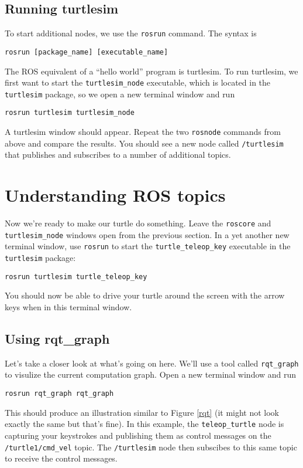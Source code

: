 \documentclass{article}
\begin{document}
\subsection{Running turtlesim}
To start additional nodes, we use the \verb=rosrun= command. The syntax is
\begin{Verbatim}[frame=single]
rosrun [package_name] [executable_name]
\end{Verbatim}

The ROS equivalent of a ``hello world'' program is turtlesim. To run turtlesim, we first want to start the \verb=turtlesim_node= executable, which is located in the \verb=turtlesim= package, so we open a new terminal window and run
\begin{Verbatim}[frame=single]
rosrun turtlesim turtlesim_node
\end{Verbatim}

A turtlesim window should appear. Repeat the two \verb=rosnode= commands from above and compare the results. You should see a new node called \verb=/turtlesim= that publishes and subscribes to a number of additional topics.

\section{Understanding ROS topics}
Now we're ready to make our turtle do something. Leave the \verb=roscore= and \verb=turtlesim_node= windows open from the previous section. In a yet another new terminal window, use \verb=rosrun= to start the \verb=turtle_teleop_key= executable in the \verb=turtlesim= package:

\begin{Verbatim}[frame=single]
rosrun turtlesim turtle_teleop_key
\end{Verbatim}

You should now be able to drive your turtle around the screen with the arrow keys when in this terminal window.

\subsection{Using rqt\_graph}
Let's take a closer look at what's going on here. We'll use a tool called \verb=rqt_graph= to visulize the current computation graph. Open a new terminal window and run
\begin{Verbatim}[frame=single]
rosrun rqt_graph rqt_graph
\end{Verbatim}

This should produce an illustration similar to Figure \ref{rqt} (it might not look exactly the same but that's fine). In this example, the \verb=teleop_turtle= node is capturing your keystrokes and publishing them as control messages on the \verb=/turtle1/cmd_vel= topic. The \verb=/turtlesim= node then subscibes to this same topic to receive the control messages.
\end{document}
